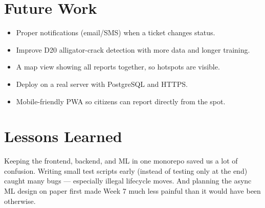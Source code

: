 \documentclass{tietreport}
\begin{document}
\section{Future Work}

\begin{itemize}
  \item Proper notifications (email/SMS) when a ticket changes status.
  \item Improve D20 alligator-crack detection with more data and longer training.
  \item A map view showing all reports together, so hotspots are visible.
  \item Deploy on a real server with PostgreSQL and HTTPS.
  \item Mobile-friendly PWA so citizens can report directly from the spot.
\end{itemize}


\section{Lessons Learned}

Keeping the frontend, backend, and ML in one monorepo saved us a lot of confusion. Writing small test scripts early (instead of testing only at the end) caught many bugs --- especially illegal lifecycle moves. And planning the async ML design on paper first made Week 7 much less painful than it would have been otherwise.

\printbibliography[heading=bibintoc]
\end{document}
